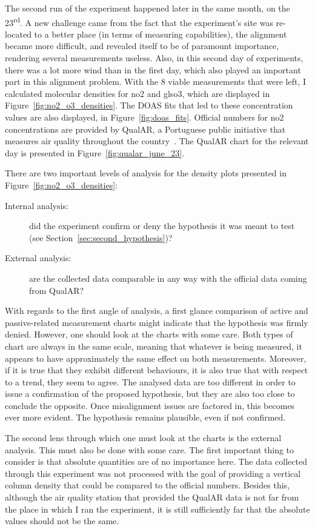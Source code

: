 The second run of the experiment happened later in the same month, on
the 23\textsuperscript{rd}. A new challenge came from the fact that the
experiment's site was re-located to a better place (in terms of
measuring capabilities),  the alignment became more difficult, and
revealed itself to be of paramount importance, rendering several
measurements useless. Also, in this second day of experiments, there was
a lot more wind than in the first day, which also played an important
part in this alignment problem. With the 8 viable measurements that were
left, I calculated molecular densities for \gls{no2} and gls{o3}, which
are displayed in Figure~\ref{fig:no2_o3_densities}. The \gls{DOAS} fits
that led to these concentration values are also displayed, in
Figure~\ref{fig:doas_fits}. Official numbers for \gls{no2}
concentrations are provided by QualAR, a Portuguese public initiative
that measures air quality throughout the country~. The
QualAR chart for the relevant day is presented in
Figure~\ref{fig:qualar_june_23}. 

There are two important levels of analysis for the density plots
presented in Figure~\ref{fig:no2_o3_densities}:
\begin{description}
    \item[Internal analysis:] did the experiment confirm or deny the
        hypothesis it was meant to test (see
        Section~\ref{sec:second_hypothesis})?
    \item[External analysis:] are the collected data comparable in any
        way with the official data coming from QualAR?
\end{description}

With regards to the first angle of analysis, a first glance comparison
of active and passive-related measurement charts might indicate that the
hypothesis was firmly denied. However, one should look at the charts
with some care. Both types of chart are always in the same scale,
meaning that whatever is being measured, it appears to have
approximately the same effect on both measurements. Moreover, if it is
true that they exhibit different behaviours, it is also true that with
respect to a trend, they seem to agree. The analysed data are too
different in order to issue a confirmation of the proposed hypothesis,
but they are also too close to conclude the opposite. Once misalignment
issues are factored in, this becomes ever more evident. The hypothesis
remains plausible, even if not confirmed. 

The second lens through which one must look at the charts is the
external analysis. This must also be done with some care. The first
important thing to consider is that absolute quantities are of no
importance here. The data collected through this experiment was not
processed with the goal of providing a vertical column density that
could be compared to the official numbers. Besides this, although the
air quality station that provided the QualAR data is not far from the
place in which I ran the experiment, it is still sufficiently far that
the absolute values should not be the same.

